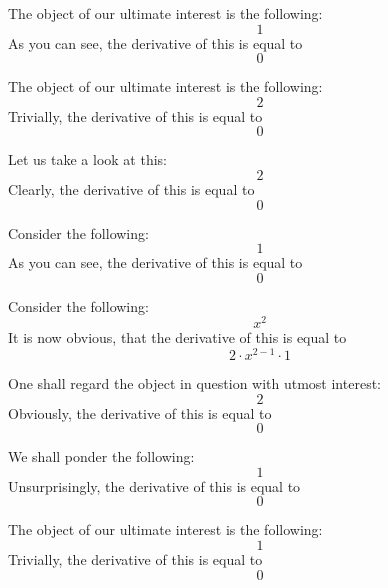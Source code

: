 \documentclass{article}
\begin{document}
The object of our ultimate interest is the following:
\begin{equation}
1 
\end{equation}
As you can see, the derivative of this is equal to
\begin{equation}
0 
\end{equation}

The object of our ultimate interest is the following:
\begin{equation}
2 
\end{equation}
Trivially, the derivative of this is equal to
\begin{equation}
0 
\end{equation}

Let us take a look at this:
\begin{equation}
2 
\end{equation}
Clearly, the derivative of this is equal to
\begin{equation}
0 
\end{equation}

Consider the following:
\begin{equation}
1 
\end{equation}
As you can see, the derivative of this is equal to
\begin{equation}
0 
\end{equation}

Consider the following:
\begin{equation}
x ^{2 } 
\end{equation}
It is now obvious, that the derivative of this is equal to
\begin{equation}
2 \cdot x ^{2 - 1 } \cdot 1 
\end{equation}

One shall regard the object in question with utmost interest:
\begin{equation}
2 
\end{equation}
Obviously, the derivative of this is equal to
\begin{equation}
0 
\end{equation}

We shall ponder the following:
\begin{equation}
1 
\end{equation}
Unsurprisingly, the derivative of this is equal to
\begin{equation}
0 
\end{equation}

The object of our ultimate interest is the following:
\begin{equation}
1 
\end{equation}
Trivially, the derivative of this is equal to
\begin{equation}
0 
\end{equation}
\end{document}

